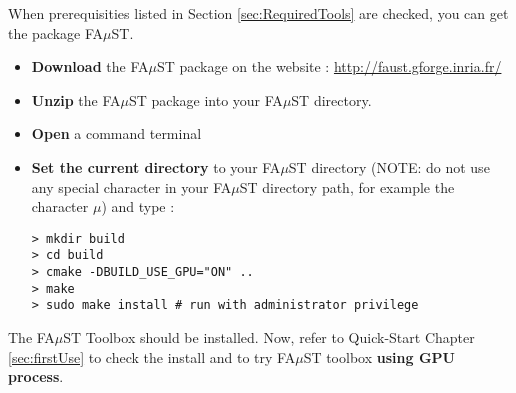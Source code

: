 When prerequisities listed in Section \ref{sec:RequiredTools} are checked, you can get the package FA$\mu$ST.
\begin{itemize}
\item \textbf{Download} the FA$\mu$ST package on the website :  \url{http://faust.gforge.inria.fr/}
\item \textbf{Unzip} the FA$\mu$ST package into your FA$\mu$ST directory.
\item \textbf{Open} a command terminal
\item \textbf{Set the current directory} to your FA$\mu$ST directory (NOTE: do not use any special character in your FA$\mu$ST directory path, for example the character $\mu$) and type :

\lstset{style=customBash}
\begin{lstlisting}
> mkdir build
> cd build
> cmake -DBUILD_USE_GPU="ON" ..
> make
> sudo make install # run with administrator privilege
\end{lstlisting}

\end{itemize}


The FA$\mu$ST Toolbox should be installed. Now, refer to Quick-Start Chapter \ref{sec:firstUse} to check the install and to try FA$\mu$ST toolbox \textbf{using GPU process}.

